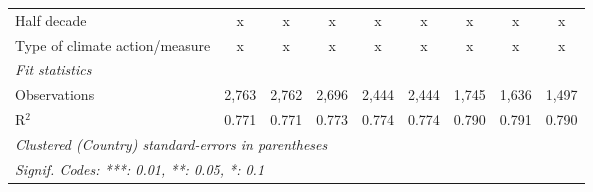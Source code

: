 \begin{tabular}{lcccccccc}
   Half decade                                               & x              & x              & x              & x              & x              & x              & x              & x\\  
   Type of climate action/measure                            & x              & x              & x              & x              & x              & x              & x              & x\\  
   \midrule \emph{Fit statistics}\\
   Observations                                              & 2,763          & 2,762          & 2,696          & 2,444          & 2,444          & 1,745          & 1,636          & 1,497\\  
   R$^2$                                                     & 0.771          & 0.771          & 0.773          & 0.774          & 0.774          & 0.790          & 0.791          & 0.790\\  
   \midrule
   \multicolumn{9}{l}{\emph{Clustered (Country) standard-errors in parentheses}}\\
   \multicolumn{9}{l}{\emph{Signif. Codes: ***: 0.01, **: 0.05, *: 0.1}}\\
\end{tabular}
\par\endgroup


